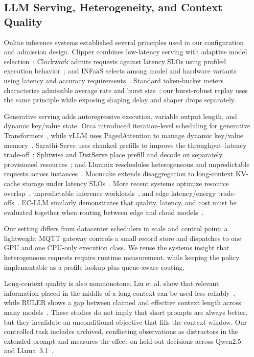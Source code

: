 \documentclass[journal]{IEEEtran}
\newcommand{\etal}{et al.}
\begin{document}
\subsection{LLM Serving, Heterogeneity, and Context Quality}

Online inference systems established several principles used in our configuration and admission design. Clipper combines low-latency serving with adaptive model selection~\cite{crankshaw2017clipper}; Clockwork admits requests against latency SLOs using profiled execution behavior~\cite{gujarati2020clockwork}; and INFaaS selects among model and hardware variants using latency and accuracy requirements~\cite{romero2021infaas}. Standard token-bucket meters characterize admissible average rate and burst size~\cite{heinanen1999srtcm}; our burst-robust replay uses the same principle while exposing shaping delay and shaper drops separately.

Generative serving adds autoregressive execution, variable output length, and dynamic key/value state. Orca introduced iteration-level scheduling for generative Transformers~\cite{yu2022orca}, while vLLM uses PagedAttention to manage dynamic key/value memory~\cite{kwon2023vllm}. Sarathi-Serve uses chunked prefills to improve the throughput--latency trade-off~\cite{agrawal2024sarathi}; Splitwise and DistServe place prefill and decode on separately provisioned resources~\cite{patel2024splitwise,zhong2024distserve}; and Llumnix reschedules heterogeneous and unpredictable requests across instances~\cite{sun2024llumnix}. Mooncake extends disaggregation to long-context KV-cache storage under latency SLOs~\cite{qin2025mooncake}. More recent systems optimize resource overlap~\cite{zhu2025nanoflow}, unpredictable inference workloads~\cite{khare2025superserve}, and edge latency/energy trade-offs~\cite{tian2025clone}. EC-LLM similarly demonstrates that quality, latency, and cost must be evaluated together when routing between edge and cloud models~\cite{han2026ecllm}.

Our setting differs from datacenter schedulers in scale and control point: a lightweight MQTT gateway controls a small record store and dispatches to one GPU and one CPU-only execution class. We reuse the systems insight that heterogeneous requests require runtime measurement, while keeping the policy implementable as a profile lookup plus queue-aware routing.

Long-context quality is also nonmonotone. Liu \etal{} show that relevant information placed in the middle of a long context can be used less reliably~\cite{liu2024lost}, while RULER shows a gap between claimed and effective context length across many models~\cite{hsieh2024ruler}. These studies do not imply that short prompts are always better, but they invalidate an unconditional objective that fills the context window. Our controlled task includes archived, conflicting observations as distractors in the extended prompt and measures the effect on held-out decisions across Qwen2.5 and Llama~3.1~\cite{grattafiori2024llama3}.
\end{document}
